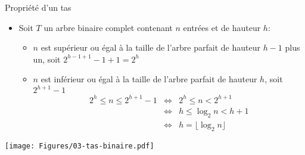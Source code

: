 \begin{frame}{Propriété d'un tas}
\label{03:hauteurtas}
\begin{itemize}
\item Soit $T$ un arbre binaire complet contenant $n$ entrées et de hauteur $h$:
\begin{itemize}
\item $n$ est supérieur ou égal à la taille de l'arbre parfait de hauteur $h-1$ plus un, soit $2^{h-1+1}-1+1=2^h$
\item $n$ est inférieur ou égal à la taille de l'arbre parfait de hauteur $h$, soit $2^{h+1}-1$
\begin{eqnarray*}
2^h\leq n\leq 2^{h+1}-1 & \Leftrightarrow & 2^h\leq n < 2^{h+1}\\
& \Leftrightarrow & h \leq \log_2 n < h+1 \\
& \Leftrightarrow & h=\lfloor \log_2 n\rfloor
\end{eqnarray*}
\end{itemize}
\end{itemize}

\centerline{\texttt{[image: Figures/03-tas-binaire.pdf]}}

\end{frame}




